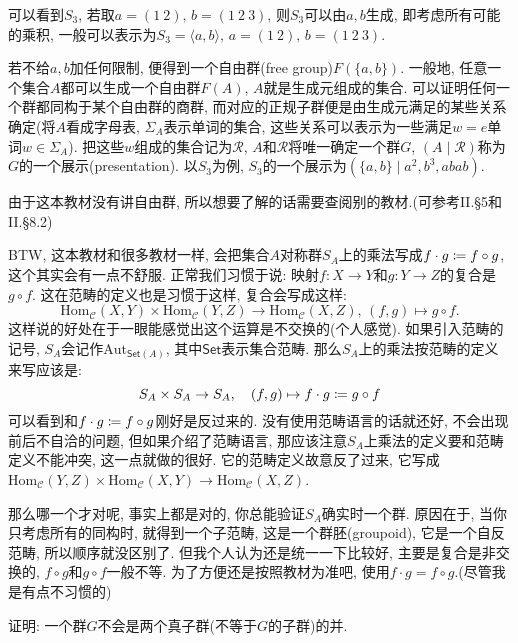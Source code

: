 \begin{remark}
    可以看到$S_3$, 若取$a = (1\:2),\, b = (1\:2\:3)$, 则$S_3$可以由$a, b$生成, 即考虑所有可能的乘积, 一般可以表示为$S_3 = \langle a, b \rangle,\, a = (1\:2),\, b = (1\:2\:3)$.
    
    若不给$a, b$加任何限制, 便得到一个自由群(free group)$F(\{a, b\})$. 一般地, 任意一个集合$A$都可以生成一个自由群$F(A)$, $A$就是生成元组成的集合. 可以证明任何一个群都同构于某个自由群的商群, 而对应的正规子群便是由生成元满足的某些关系确定(将$A$看成字母表, $\Sigma_A$表示单词的集合, 这些关系可以表示为一些满足$w = e$单词$w \in \Sigma_A$). 把这些$w$组成的集合记为$\mathscr{R}$, $A$和$\mathscr{R}$将唯一确定一个群$G$, $(A \mid \mathscr{R})$称为$G$的一个展示(presentation). 以$S_3$为例, $S_3$的一个展示为$(\{a, b\} \mid a^2, b^3, abab)$.
    
    由于这本教材没有讲自由群, 所以想要了解的话需要查阅别的教材.(可参考\cite{aluffi2009algebra}II.\S5和II.\S8.2)
    
    BTW, 这本教材和很多教材一样, 会把集合$A$对称群$S_A$上的乘法写成$f \cdot g \mathrel{\coloneqq} f \circ g$, 这个其实会有一点不舒服. 正常我们习惯于说: 映射$f:X \to Y$和$g:Y \to Z$的复合是$g \circ f$. 这在范畴的定义也是习惯于这样, 复合会写成这样:
    \[
        \mathrm{Hom}_{\mathcal{C}}(X, Y) \times \mathrm{Hom}_{\mathcal{C}}(Y, Z) \to \mathrm{Hom}_{\mathcal{C}}(X, Z),\, (f, g) \mapsto g \circ f.
    \]
    这样说的好处在于一眼能感觉出这个运算是不交换的(个人感觉). 如果引入范畴的记号, $S_A$会记作$\mathrm{Aut}_{\mathsf{Set}(A)}$, 其中$\mathsf{Set}$表示集合范畴. 那么$S_A$上的乘法按范畴的定义来写应该是:
    \[
        S_A \times S_A \to S_A,\quad (f, g) \mapsto f \cdot g \mathrel{\coloneqq} g \circ f
    \]
    可以看到和$f \cdot g \mathrel{\coloneqq} f \circ g$刚好是反过来的. 没有使用范畴语言的话就还好, 不会出现前后不自洽的问题, 但如果介绍了范畴语言, 那应该注意$S_A$上乘法的定义要和范畴定义不能冲突, 这一点\cite{hungerford2003algebra}就做的很好. 它的范畴定义故意反了过来, 它写成$\mathrm{Hom}_{\mathcal{C}}(Y, Z) \times \mathrm{Hom}_{\mathcal{C}}(X, Y) \to \mathrm{Hom}_{\mathcal{C}}(X, Z)$.
    
    那么哪一个才对呢, 事实上都是对的, 你总能验证$S_A$确实时一个群. 原因在于, 当你只考虑所有的同构时, 就得到一个子范畴, 这是一个群胚(groupoid), 它是一个自反范畴, 所以顺序就没区别了. 但我个人认为还是统一一下比较好, 主要是复合是非交换的, $f \circ g$和$g \circ f$一般不等. 为了方便还是按照教材为准吧, 使用$f \cdot g = f \circ g$.(尽管我是有点不习惯的)
\end{remark}

\begin{problem}
    证明: 一个群$G$不会是两个真子群(不等于$G$的子群)的并.
\end{problem}


